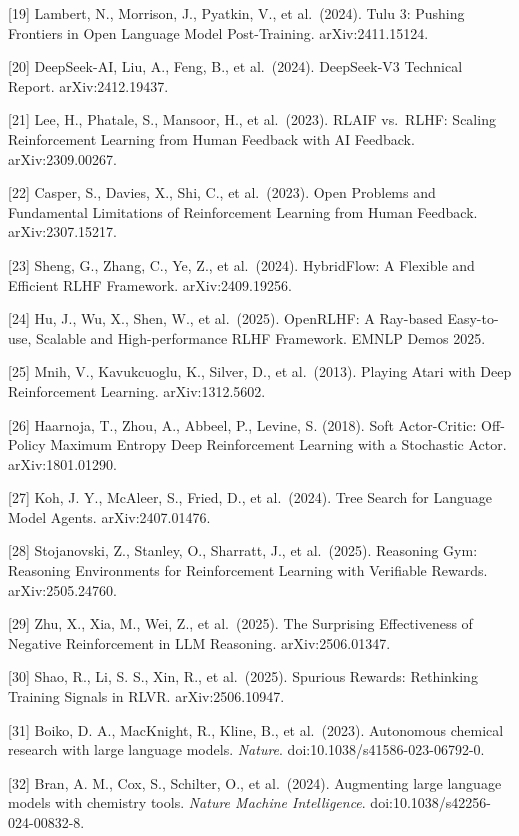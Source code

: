 {[}19{]} Lambert, N., Morrison, J., Pyatkin, V., et al.~(2024). Tulu 3: Pushing Frontiers in Open Language Model Post-Training. arXiv:2411.15124.

{[}20{]} DeepSeek-AI, Liu, A., Feng, B., et al.~(2024). DeepSeek-V3 Technical Report. arXiv:2412.19437.

{[}21{]} Lee, H., Phatale, S., Mansoor, H., et al.~(2023). RLAIF vs.~RLHF: Scaling Reinforcement Learning from Human Feedback with AI Feedback. arXiv:2309.00267.

{[}22{]} Casper, S., Davies, X., Shi, C., et al.~(2023). Open Problems and Fundamental Limitations of Reinforcement Learning from Human Feedback. arXiv:2307.15217.

{[}23{]} Sheng, G., Zhang, C., Ye, Z., et al.~(2024). HybridFlow: A Flexible and Efficient RLHF Framework. arXiv:2409.19256.

{[}24{]} Hu, J., Wu, X., Shen, W., et al.~(2025). OpenRLHF: A Ray-based Easy-to-use, Scalable and High-performance RLHF Framework. EMNLP Demos 2025.

{[}25{]} Mnih, V., Kavukcuoglu, K., Silver, D., et al.~(2013). Playing Atari with Deep Reinforcement Learning. arXiv:1312.5602.

{[}26{]} Haarnoja, T., Zhou, A., Abbeel, P., Levine, S. (2018). Soft Actor-Critic: Off-Policy Maximum Entropy Deep Reinforcement Learning with a Stochastic Actor. arXiv:1801.01290.

{[}27{]} Koh, J. Y., McAleer, S., Fried, D., et al.~(2024). Tree Search for Language Model Agents. arXiv:2407.01476.

{[}28{]} Stojanovski, Z., Stanley, O., Sharratt, J., et al.~(2025). Reasoning Gym: Reasoning Environments for Reinforcement Learning with Verifiable Rewards. arXiv:2505.24760.

{[}29{]} Zhu, X., Xia, M., Wei, Z., et al.~(2025). The Surprising Effectiveness of Negative Reinforcement in LLM Reasoning. arXiv:2506.01347.

{[}30{]} Shao, R., Li, S. S., Xin, R., et al.~(2025). Spurious Rewards: Rethinking Training Signals in RLVR. arXiv:2506.10947.

{[}31{]} Boiko, D. A., MacKnight, R., Kline, B., et al.~(2023). Autonomous chemical research with large language models. \emph{Nature}. doi:10.1038/s41586-023-06792-0.

{[}32{]} Bran, A. M., Cox, S., Schilter, O., et al.~(2024). Augmenting large language models with chemistry tools. \emph{Nature Machine Intelligence}. doi:10.1038/s42256-024-00832-8.

